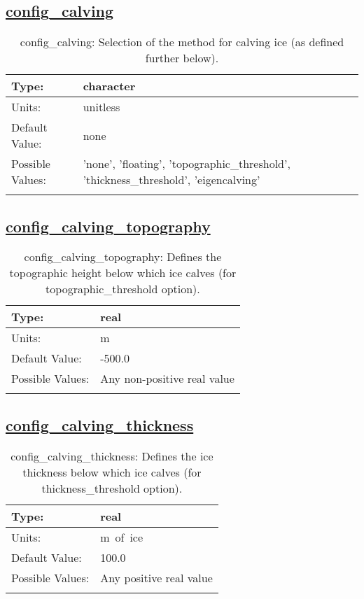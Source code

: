 \subsection[config\_calving]{\hyperref[sec:nm_tab_calving]{config\_calving}}
\label{subsec:nm_sec_config_calving}
\begin{center}
\begin{longtable}{| p{2.0in} || p{4.0in} |}
    \hline
    Type: & character \\
    \hline
    Units: & \si{unitless} \\
    \hline
    Default Value: & none \\
    \hline
    Possible Values: & 'none', 'floating', 'topographic\_threshold', 'thickness\_threshold', 'eigencalving'  \\
    \hline
    \caption{config\_calving: Selection of the method for calving ice (as defined further below).}
\end{longtable}
\end{center}
\subsection[config\_calving\_topography]{\hyperref[sec:nm_tab_calving]{config\_calving\_topography}}
\label{subsec:nm_sec_config_calving_topography}
\begin{center}
\begin{longtable}{| p{2.0in} || p{4.0in} |}
    \hline
    Type: & real \\
    \hline
    Units: & \si{m} \\
    \hline
    Default Value: & -500.0 \\
    \hline
    Possible Values: & Any non-positive real value \\
    \hline
    \caption{config\_calving\_topography: Defines the topographic height below which ice calves (for topographic\_threshold option).}
\end{longtable}
\end{center}
\subsection[config\_calving\_thickness]{\hyperref[sec:nm_tab_calving]{config\_calving\_thickness}}
\label{subsec:nm_sec_config_calving_thickness}
\begin{center}
\begin{longtable}{| p{2.0in} || p{4.0in} |}
    \hline
    Type: & real \\
    \hline
    Units: & \si{m.of.ice} \\
    \hline
    Default Value: & 100.0 \\
    \hline
    Possible Values: & Any positive real value \\
    \hline
    \caption{config\_calving\_thickness: Defines the ice thickness below which ice calves (for thickness\_threshold option).}
\end{longtable}
\end{center}
